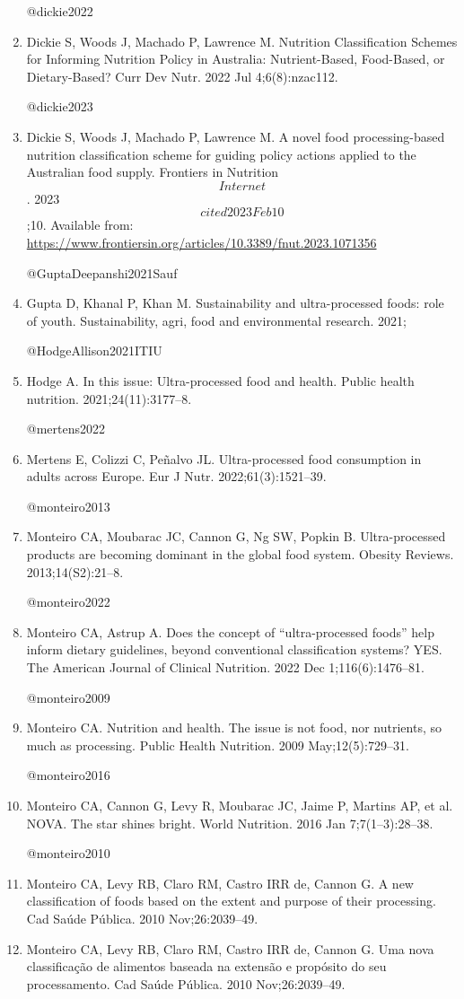 \documentclass[
]{article}
\begin{document}
\begin{enumerate}
  @dickie2022
\item
  Dickie S, Woods J, Machado P, Lawrence M. Nutrition Classification
  Schemes for Informing Nutrition Policy in Australia: Nutrient-Based,
  Food-Based, or Dietary-Based? Curr Dev Nutr. 2022 Jul 4;6(8):nzac112.

  @dickie2023
\item
  Dickie S, Woods J, Machado P, Lawrence M. A novel food
  processing-based nutrition classification scheme for guiding policy
  actions applied to the Australian food supply. Frontiers in Nutrition
  \[Internet\]. 2023 \[cited 2023 Feb 10\];10. Available from:
  \url{https://www.frontiersin.org/articles/10.3389/fnut.2023.1071356}

  @GuptaDeepanshi2021Sauf
\item
  Gupta D, Khanal P, Khan M. Sustainability and ultra-processed foods:
  role of youth. Sustainability, agri, food and environmental research.
  2021;

  @HodgeAllison2021ITIU
\item
  Hodge A. In this issue: Ultra-processed food and health. Public health
  nutrition. 2021;24(11):3177--8.

  @mertens2022
\item
  Mertens E, Colizzi C, Peñalvo JL. Ultra-processed food consumption in
  adults across Europe. Eur J Nutr. 2022;61(3):1521--39.

  @monteiro2013
\item
  Monteiro CA, Moubarac JC, Cannon G, Ng SW, Popkin B. Ultra-processed
  products are becoming dominant in the global food system. Obesity
  Reviews. 2013;14(S2):21--8.

  @monteiro2022
\item
  Monteiro CA, Astrup A. Does the concept of ``ultra-processed foods''
  help inform dietary guidelines, beyond conventional classification
  systems? YES. The American Journal of Clinical Nutrition. 2022 Dec
  1;116(6):1476--81.

  @monteiro2009
\item
  Monteiro CA. Nutrition and health. The issue is not food, nor
  nutrients, so much as processing. Public Health Nutrition. 2009
  May;12(5):729--31.

  @monteiro2016
\item
  Monteiro CA, Cannon G, Levy R, Moubarac JC, Jaime P, Martins AP, et
  al. NOVA. The star shines bright. World Nutrition. 2016 Jan
  7;7(1--3):28--38.

  @monteiro2010
\item
  Monteiro CA, Levy RB, Claro RM, Castro IRR de, Cannon G. A new
  classification of foods based on the extent and purpose of their
  processing. Cad Saúde Pública. 2010 Nov;26:2039--49.
\item
  Monteiro CA, Levy RB, Claro RM, Castro IRR de, Cannon G. Uma nova
  classificação de alimentos baseada na extensão e propósito do seu
  processamento. Cad Saúde Pública. 2010 Nov;26:2039--49.


\end{enumerate}
\end{document}
